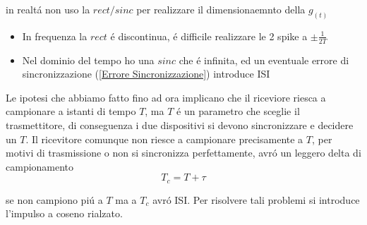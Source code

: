             in realtá non uso la $rect/sinc$ per realizzare il dimensionaemnto della $g_{(t)}$ 
            \begin{itemize}
                \item {In frequenza la $rect$ é discontinua, é difficile realizzare le 2 spike a $\pm\frac{1}{2T}$}
                \item {Nel dominio del tempo ho una $sinc$ che é infinita, ed un eventuale errore di sincronizzazione
                (\ref{Errore Sincronizzazione}) introduce ISI}
            \end{itemize}
            Le ipotesi che abbiamo fatto fino ad ora implicano che il riceviore riesca a campionare a istanti
            di tempo $T$, ma $T$ é un parametro che sceglie il trasmettitore, di conseguenza\label{Errore Sincronizzazione}
            i due dispositivi si devono sincronizzare e decidere un $T$. Il ricevitore comunque non riesce a campionare
            precisamente a $T$, per motivi di trasmissione o non si sincronizza perfettamente, avró un leggero delta di campionamento
            \[
                T_c = T+ \tau  
            \]
            \begin{figure}[H]
                \centering
            \end{figure}
            se non campiono piú a $T$ ma a $T_c$ avró ISI. Per risolvere tali problemi si introduce l'impulso a coseno rialzato.
            
